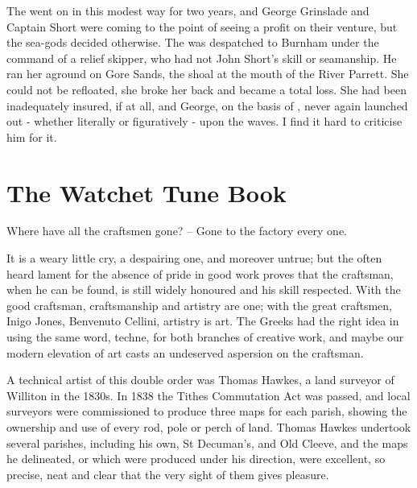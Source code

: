 The  went on in this modest way for two years, and George Grinslade and	Captain Short were coming to the point of seeing a profit on their venture, but the sea-gods decided otherwise. The  was	despatched to Burnham under the command of a relief skipper, who had not John Short's skill or seamanship. He ran her aground on Gore Sands, the shoal at the mouth of the River Parrett. She could not be refloated, she broke her back and became a total loss. She had been inadequately insured, if at all, and George, on the basis of , never again launched out - whether literally or figuratively - upon the waves.
I find it hard to criticise him for it.
 
\section{The Watchet Tune Book}

Where have all the craftsmen gone? –
Gone to the factory every one.

It is a weary little cry, a despairing one, and moreover untrue; but the often heard lament for the absence of pride in good work proves that the craftsman, when he can be found, is still widely honoured and his skill respected. With the good craftsman, craftsmanship and artistry are one; with the great craftsmen, Inigo Jones, Benvenuto Cellini, artistry is art. The Greeks had the right idea in using the same word, techne, for both branches of creative work, and maybe our modern elevation of art casts an undeserved aspersion on the craftsman.

A technical artist of this double order was Thomas Hawkes, a land surveyor of Williton in the 1830s. In 1838 the Tithes Commutation Act was passed, and local surveyors were commissioned to produce three maps for each parish, showing the ownership and use of every rod, pole or perch of land. Thomas Hawkes undertook several parishes, including his own, St Decuman's, and Old Cleeve, and the maps he delineated, or which were produced under his direction, were excellent, so precise, neat and clear that the very sight of them gives pleasure.

